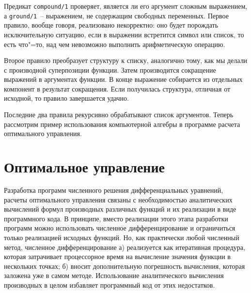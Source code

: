 \documentclass[a4paper,14pt, openany, twoside, final]{extbook} %
\begin{document}
Предикат \texttt{compound/1} проверяет, является ли его аргумент сложным выражением, а \texttt{ground/1}~-- выражением, не содержащим свободных переменных.  Первое правило, вообще говоря, реализовано некорректно: оно будет порождать исключительную ситуацию, если в выражении встретится символ или список, то есть что"=то, над чем невозможно выполнить арифметическую операцию.

Второе правило преобразует структуру к списку, аналогично тому, как мы делали с производной суперпозиции функции.  Затем производится сокращение выражений в аргументах функции.  В конце выражение собирается из отдельных компонент в результат сокращения.  Если получилась структура, отличная от исходной, то правило завершается удачно.

Последние два правила рекурсивно обрабатывают список аргументов.  Теперь рассмотрим пример использования компьютерной алгебры в программе расчета оптимального управления.

\section{Оптимальное управление}
\label{sec:optcontr}

\newcommand{\vecx}{\mathbfit{x}}
\newcommand{\vecf}{\mathbfit{f}}
\newcommand{\vecg}{\mathbfit{g}}
\newcommand{\vecu}{\mathbfit{u}}
\newcommand{\vecpsi}{\mathbfit{\psi}}
\newcommand{\vecH}{\mathbfit{H}}

Разработка программ численного решения дифференциальных уравнений, расчеты оптимального управления связаны с необходимостью аналитических вычислений формул производных различных функций и их реализации в виде программного кода.  В принципе, вместо реализации этого этапа разработки программ можно использовать численное дифференцирование и ограничиться только реализацией исходных функций.  Но, как практически любой численный метод, численное дифференцирование а) реализуется как итеративная процедура, которая затрачивает процессорное время на вычисление значения функции в нескольких точках; б) вносит дополнительную погрешность вычисления, которая заложена уже в самом методе.  Использование аналитического вычисления производных в целом избавляет программный код от этих недостатков.
\end{document}
